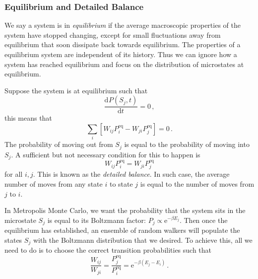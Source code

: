 \documentclass{article}
\theoremstyle{plain}\theoremheaderfont{\normalfont\itshape}\theorembodyfont{\rmfamily}\theoremseparator{.}\newtheorem*{rem}{Remark}\newtheorem*{ex}{Example}\newtheorem*{proof}{Proof}\newtheorem*{altp}{Alternative proof}
\theoremstyle{plain}\theoremheaderfont{\normalfont\bfseries}\theorembodyfont{\rmfamily}\theoremseparator{.}\newtheorem{thm}{Theorem}[section]\newtheorem{lem}[thm]{Lemma}\newtheorem{prop}[thm]{Proposition}\newtheorem*{cor}{Corollary}\newtheorem{defn}[thm]{Definition}\newtheorem{clm}[thm]{Claim}\newtheorem{clminproof}{Claim}\newtheorem{alg}[thm]{Algorithm}\newtheorem{hyp}[thm]{Hypothesis}\newtheorem{law}[thm]{Law}
\theoremstyle{break}\theoremheaderfont{\normalfont\itshape}\theorembodyfont{\rmfamily}\theoremseparator{.\medskip}\newtheorem*{proofskip}{Proof}\newtheorem*{exs}{Examples}\newtheorem*{rems}{Remarks}
\theoremstyle{break}\theoremheaderfont{\normalfont\bfseries}\theorembodyfont{\rmfamily}\theoremseparator{.\medskip}\newtheorem{lemskip}[thm]{Lemma}\newtheorem{defnskip}[thm]{Definition}\newtheorem{propskip}[thm]{Proposition}\newtheorem{thmskip}[thm]{Theorem}
\numberwithin{equation}{section}
\newcommand{\ee}{\mathrm{e}}
\newcommand{\dv}[3][]{\frac{\mathrm{d}^{#1} #2}{{\mathrm{d} #3}^{#1}}}
\begin{document}
    \subsubsection{Equilibrium and Detailed Balance}
    We say a system is in \textit{equilibrium} if the average macroscopic properties of the system have stopped changing, except for small fluctuations away from equilibrium that soon dissipate back towards equilibrium. The properties of a equilibrium system are independent of its history. Thus we can ignore how a system has reached equilibrium and focus on the distribution of microstates at equilibrium.

    Suppose the system is at equilibrium such that
    \begin{equation}
        \dv{P(S_j,t)}{t}=0\,,
    \end{equation}
    this means that
    \begin{equation}
        \sum_i[W_{ij}P_i^{\text{eq}}-W_{ji}P_j^{\text{eq}}]=0\,.
    \end{equation}
    The probability of moving out from \(S_j\) is equal to the probability of moving into \(S_j\). A sufficient but not necessary condition for this to happen is
    \begin{equation}
        W_{ij}P_i^{\text{eq}}=W_{ji}P_j^{\text{eq}}
    \end{equation}
    for all \(i,j\). This is known as the \textit{detailed balance}. In such case, the average number of moves from any state \(i\) to state \(j\) is equal to the number of moves from \(j\) to \(i\).

    In Metropolis Monte Carlo, we want the probability that the system sits in the microstate \(S_j\) is equal to its Boltzmann factor: \(P_j\propto \ee^{-\beta E_j}\). Then once the equilibrium has established, an ensemble of random walkers will populate the states \(S_j\) with the Boltzmann distribution that we desired. To achieve this, all we need to do is to choose the correct transition probabilities such that
    \begin{equation}
        \frac{W_{ij}}{W_{ji}}=\frac{P_j^{\text{eq}}}{P_i^{\text{eq}}}=\ee^{-\beta (E_j-E_i)}\,.
    \end{equation}
\end{document}
